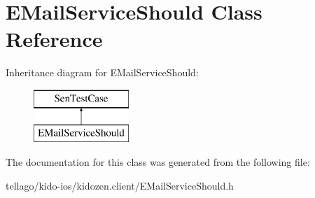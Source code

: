 \hypertarget{interface_e_mail_service_should}{\section{E\-Mail\-Service\-Should Class Reference}
\label{interface_e_mail_service_should}
}
Inheritance diagram for E\-Mail\-Service\-Should\-:\begin{figure}[H]
\begin{center}
\leavevmode
\includegraphics[height=2.000000cm]{interface_e_mail_service_should}
\end{center}
\end{figure}


The documentation for this class was generated from the following file\-:\begin{DoxyCompactItemize}
\item 
tellago/kido-\/ios/kidozen.\-client/E\-Mail\-Service\-Should.\-h\end{DoxyCompactItemize}
